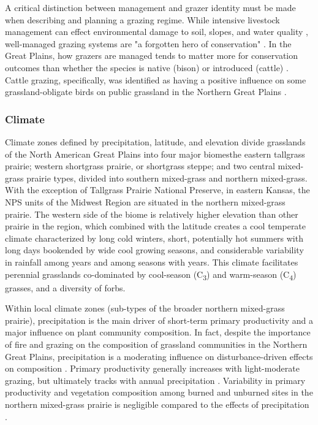 A critical distinction between management and grazer identity must be made when describing and planning a grazing regime. 
While intensive livestock management can effect environmental damage to soil, slopes, and water quality \citep{bilotta2007}, well-managed grazing systems are "a forgotten hero of conservation" \citep{franzluebbers2012}.
In the Great Plains, how grazers are managed tends to matter more for conservation outcomes than whether the species is native (bison) or introduced (cattle) \citep{allred2011a}. 
Cattle grazing, specifically, was identified as having a positive influence on some grassland-obligate birds on public grassland in the Northern Great Plains \citep{ahlering2016}.

\subsubsection{Climate}

Climate zones defined by precipitation, latitude, and elevation divide grasslands of the North American Great Plains into four major biomes\textemdash the eastern tallgrass prairie; western shortgrass prairie, or shortgrass steppe; and two central mixed-grass prairie types, divided into southern mixed-grass and northern mixed-grass. 
With the exception of Tallgrass Prairie National Preserve, in eastern Kansas, the NPS units of the Midwest Region are situated in the northern mixed-grass prairie. 
The western side of the biome is relatively higher elevation than other prairie in the region, which combined with the latitude creates a cool temperate climate characterized by long cold winters, short, potentially hot summers with long days bookended by wide cool growing seasons, and considerable variability in rainfall among years and among seasons with years. 
This climate facilitates perennial grasslands co-dominated by cool-season (C\textsubscript{3}) and warm-season (C\textsubscript{4}) grasses, and a diversity of forbs.

Within local climate zones (sub-types of the broader northern mixed-grass prairie), precipitation is the main driver of short-term primary productivity and a major influence on  plant community composition. 
In fact, despite the importance of fire and grazing on the composition of grassland communities in the Northern Great Plains, precipitation is a moderating influence on disturbance-driven effects on composition \citep{ahlering2016}. 
Primary productivity generally increases with light-moderate grazing, but ultimately tracks with annual precipitation \citep{patton2007}.
Variability in primary productivity and vegetation composition among burned and unburned sites in the northern mixed-grass prairie is negligible compared to the effects of precipitation \citep{whisenant1989, erichsen-arychuk2002}. 

